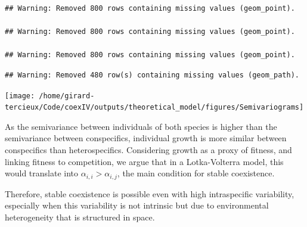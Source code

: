 \documentclass[
]{article}
\newenvironment{Shaded}{\begin{snugshade}}{\end{snugshade}}
\newcommand{\CommentTok}[1]{\textcolor[rgb]{0.56,0.35,0.01}{\textit{#1}}}
\newcommand{\DataTypeTok}[1]{\textcolor[rgb]{0.13,0.29,0.53}{#1}}
\newcommand{\DecValTok}[1]{\textcolor[rgb]{0.00,0.00,0.81}{#1}}
\newcommand{\KeywordTok}[1]{\textcolor[rgb]{0.13,0.29,0.53}{\textbf{#1}}}
\newcommand{\NormalTok}[1]{#1}
\newcommand{\OperatorTok}[1]{\textcolor[rgb]{0.81,0.36,0.00}{\textbf{#1}}}
\newcommand{\StringTok}[1]{\textcolor[rgb]{0.31,0.60,0.02}{#1}}
\begin{document}
\begin{Shaded}
\end{Shaded}

\begin{verbatim}
## Warning: Removed 800 rows containing missing values (geom_point).

## Warning: Removed 800 rows containing missing values (geom_point).

## Warning: Removed 800 rows containing missing values (geom_point).
\end{verbatim}

\begin{verbatim}
## Warning: Removed 480 row(s) containing missing values (geom_path).
\end{verbatim}

\texttt{[image: /home/girard-tercieux/Code/coexIV/outputs/theoretical\_model/figures/Semivariograms]}

As the semivariance between individuals of both species is higher than
the semivariance between conspecifics, individual growth is more similar
between conspecifics than heterospecifics. Considering growth as a proxy
of fitness, and linking fitness to competition, we argue that in a
Lotka-Volterra model, this would translate into
\(\alpha_{i,i} > \alpha_{i,j}\), the main condition for stable
coexistence.

Therefore, stable coexistence is possible even with high intraspecific
variability, especially when this variability is not intrinsic but due
to environmental heterogeneity that is structured in space.
\end{document}
